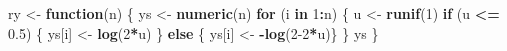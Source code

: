 \documentclass[
]{article}
\newenvironment{Shaded}{\begin{snugshade}}{\end{snugshade}}
\newcommand{\ControlFlowTok}[1]{\textcolor[rgb]{0.13,0.29,0.53}{\textbf{#1}}}
\newcommand{\DecValTok}[1]{\textcolor[rgb]{0.00,0.00,0.81}{#1}}
\newcommand{\FloatTok}[1]{\textcolor[rgb]{0.00,0.00,0.81}{#1}}
\newcommand{\FunctionTok}[1]{\textcolor[rgb]{0.13,0.29,0.53}{\textbf{#1}}}
\newcommand{\NormalTok}[1]{#1}
\newcommand{\OtherTok}[1]{\textcolor[rgb]{0.56,0.35,0.01}{#1}}
\newcommand{\SpecialCharTok}[1]{\textcolor[rgb]{0.81,0.36,0.00}{\textbf{#1}}}
\begin{document}
\begin{Shaded}
\begin{Highlighting}[]
\NormalTok{ry }\OtherTok{\textless{}{-}} \ControlFlowTok{function}\NormalTok{(n)}
\NormalTok{\{}
\NormalTok{  ys }\OtherTok{\textless{}{-}} \FunctionTok{numeric}\NormalTok{(n)}
  \ControlFlowTok{for}\NormalTok{ (i }\ControlFlowTok{in} \DecValTok{1}\SpecialCharTok{:}\NormalTok{n)}
\NormalTok{  \{}
\NormalTok{    u }\OtherTok{\textless{}{-}} \FunctionTok{runif}\NormalTok{(}\DecValTok{1}\NormalTok{)}
    \ControlFlowTok{if}\NormalTok{ (u }\SpecialCharTok{\textless{}=} \FloatTok{0.5}\NormalTok{) \{ ys[i] }\OtherTok{\textless{}{-}} \FunctionTok{log}\NormalTok{(}\DecValTok{2}\SpecialCharTok{*}\NormalTok{u) \}}
    \ControlFlowTok{else}\NormalTok{ \{ ys[i] }\OtherTok{\textless{}{-}} \SpecialCharTok{{-}}\FunctionTok{log}\NormalTok{(}\DecValTok{2{-}2}\SpecialCharTok{*}\NormalTok{u)\}}
\NormalTok{  \}}
\NormalTok{  ys}
\NormalTok{\}}
\end{Highlighting}
\end{Shaded}
\end{document}
